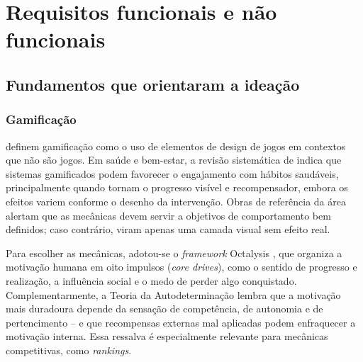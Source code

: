 %

\chapter{Requisitos funcionais e não funcionais}
\label{cap:requisitos}

\section{Fundamentos que orientaram a ideação}
\label{sec:fundamentos}

\subsection{Gamificação}

 definem gamificação como o uso de elementos de
design de jogos em contextos que não são jogos. Em saúde e bem-estar, a
revisão sistemática de  indica que sistemas
gamificados podem favorecer o engajamento com hábitos saudáveis,
principalmente quando tornam o progresso visível e recompensador, embora
os efeitos variem conforme o desenho da intervenção. Obras de referência
da área \cite{zichermann2011,kapp2012} alertam que as mecânicas devem
servir a objetivos de comportamento bem definidos; caso contrário, viram
apenas uma camada visual sem efeito real.

Para escolher as mecânicas, adotou-se o \textit{framework} Octalysis
\cite{chou2015}, que organiza a motivação humana em oito impulsos
(\textit{core drives}), como o sentido de progresso e realização, a
influência social e o medo de perder algo conquistado. Complementarmente,
a Teoria da Autodeterminação \cite{ryan2000} lembra que a motivação mais
duradoura depende da sensação de competência, de autonomia e de
pertencimento -- e que recompensas externas mal aplicadas podem enfraquecer
a motivação interna. Essa ressalva é especialmente relevante para
mecânicas competitivas, como \textit{rankings}.

